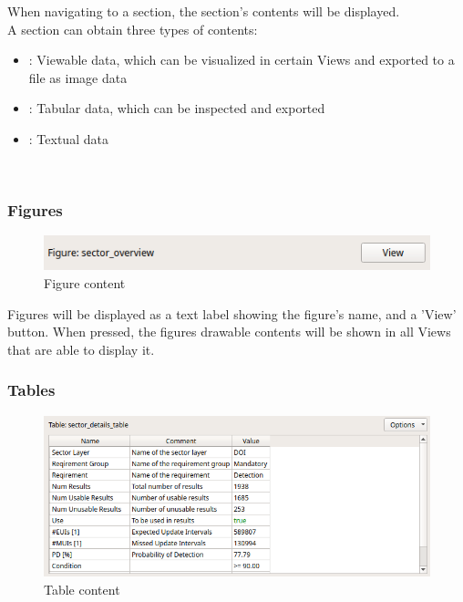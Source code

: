 When navigating to a section, the section's contents will be displayed. \\

A section can obtain three types of contents:

\begin{itemize}  
    \item {}: Viewable data, which can be visualized in certain Views and exported to a file as image data
    \item {}: Tabular data, which can be inspected and exported
    \item {}: Textual data
\end{itemize}
\ \\

\subsubsection{Figures} 
\label{sec:report_section_figures}

\begin{figure}[H]
    \hspace*{-2.5cm}
    \center
    \includegraphics[width=12cm,frame]{figures/content_figure.png}
  \caption{Figure content}
\end{figure}

Figures will be displayed as a text label showing the figure's name, and a 'View' button. When pressed, the figures 
drawable contents will be shown in all Views that are able to display it.

\subsubsection{Tables} 
\label{sec:report_section_tables}

\begin{figure}[H]
    \hspace*{-2.5cm}
    \center
    \includegraphics[width=12cm,frame]{figures/content_table.png}
  \caption{Table content}
\end{figure}

